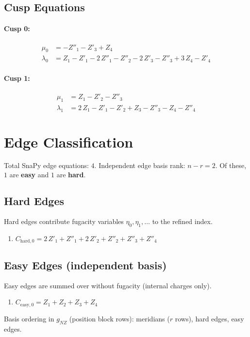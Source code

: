 \documentclass[11pt,a4paper]{article}
\begin{document}
\subsection*{Cusp Equations}
\paragraph{Cusp 0:}
\begin{align*}
  \mu_0 &= -Z''_{1} - Z'_{3} + Z_{4} \\
  \lambda_0 &= Z_{1} - Z'_{1} - 2\,Z''_{1} - Z''_{2} - 2\,Z'_{3} - Z''_{3} + 3\,Z_{4} - Z'_{4}
\end{align*}
\paragraph{Cusp 1:}
\begin{align*}
  \mu_1 &= Z_{1} - Z'_{2} - Z''_{3} \\
  \lambda_1 &= 2\,Z_{1} - Z'_{1} - Z'_{2} + Z_{3} - Z''_{3} - Z_{4} - Z''_{4}
\end{align*}

\section{Edge Classification}
Total SnaPy edge equations: $4$.
Independent edge basis rank: $n - r = 2$.
Of these, $1$ are \textbf{easy} and $1$ are \textbf{hard}.

\subsection{Hard Edges}
Hard edges contribute fugacity variables $\eta_0, \eta_1, \ldots$ to the refined index.
\begin{enumerate}
  \item $C_{\text{hard},0} = 2\,Z'_{1} + Z''_{1} + 2\,Z'_{2} + Z''_{2} + Z''_{3} + Z''_{4}$
\end{enumerate}

\subsection{Easy Edges (independent basis)}
Easy edges are summed over without fugacity (internal charges only).
\begin{enumerate}
  \item $C_{\text{easy},0} = Z_{1} + Z_{2} + Z_{3} + Z_{4}$
\end{enumerate}

Basis ordering in $g_{NZ}$ (position block rows): meridians ($r$ rows), hard edges, easy edges.
\end{document}
